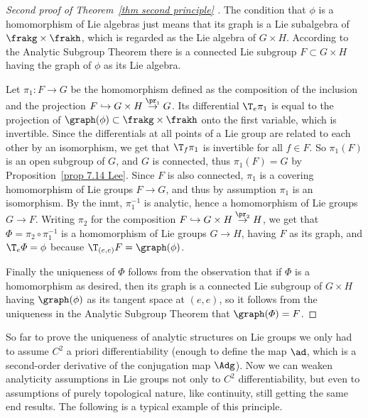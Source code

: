 \begin{proof}[Second proof of Theorem~\ref{thm second principle} {{\cite[Cor.~1.10.5]{DK}}}]
    The condition that $\phi$ is a homomorphism of Lie algebras just means that its graph is a Lie subalgebra of $\frakg\times\frakh$, which is regarded as the Lie algebra of $G\times H$. According to the Analytic Subgroup Theorem there is a connected Lie subgroup $F\subset G\times H$ having the graph of $\phi$ as its Lie algebra.

    Let $\pi_1:F\to G$ be the homomorphism defined as the composition of the inclusion and the projection $F\hookrightarrow G\times H\overset{\pr_1}{\to} G$. Its differential $\T_e \pi_1$ is equal to the projection of $\graph(\phi)\subset \frakg\times\frakh$ onto the first variable, which is invertible. Since the differentials at all points of a Lie group are related to each other by an isomorphism, we get that $\T_f\pi_1$ is invertible for all $f\in F$. So $\pi_1(F)$ is an open subgroup of $G$, and $G$ is connected, thus $\pi_1(F)=G$ by Proposition~\ref{prop 7.14 Lee}. Since $F$ is also connected, $\pi_1$ is a covering homomorphism of Lie groups $F\to G$, and thus by assumption $\pi_1$ is an isomorphism. By the \gls{inmt}, $\pi_1^{-1}$ is analytic, hence a homomorphism of Lie groups $G\to F$. Writing $\pi_2$ for the composition $F\hookrightarrow G\times H\overset{\pr_2}{\to} H$, we get that $\varPhi=\pi_2\circ \pi_1^{-1}$ is a homomorphism of Lie groups $G\to H$, having $F$ as its graph, and $\T_e \varPhi=\phi$ because $\T_{(e,e)}F=\graph(\phi)$.

    Finally the uniqueness of $\varPhi$ follows from the observation that if $\varPhi$ is a homomorphism as desired, then its graph is a connected Lie subgroup of $G\times H$ having $\graph(\phi)$ as its tangent space at $(e,e)$, so it follows from the uniqueness in the Analytic Subgroup Theorem that $\graph(\varPhi)=F$.
\end{proof}


So far to prove the uniqueness of analytic structures on Lie groups we only had to assume $C^2$ a priori differentiability (enough to define the map $\ad$, which is a second-order derivative of the conjugation map $\Adg$). Now we can weaken analyticity assumptions in Lie groups not only to $C^2$ differentiability, but even to assumptions of purely topological nature, like continuity, still getting the same end results. The following is a typical example of this principle.

